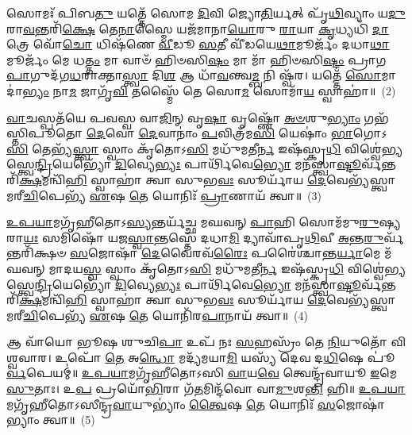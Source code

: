𑌸𑍋𑌮𑌃᳴ 𑌪𑌿𑌬\-\ul{𑌤𑍁} 𑌯𑌤𑍍𑌤𑍇᳴ 𑌸𑍋𑌮 \ul{𑌦𑌿}\-𑌵𑌿 𑌜𑍍𑌯𑍋\-\ul{𑌤𑌿}\-𑌰𑍍𑌯𑌤𑍍 𑌪𑍃᳴\-\ul{𑌥𑌿}\-𑌵𑍍𑌯𑌾𑌂 𑌯\-\ul{𑌦𑍁}\-𑌰𑌾\-\ul{𑌵}\-𑌨𑍍𑌤𑌰𑌿᳴\-\ul{𑌕𑍍𑌷𑍇} 𑌤𑍇\-\ul{𑌨𑌾}\-𑌸𑍍𑌮𑍈 𑌯𑌜᳴𑌮𑌾𑌨𑌾\-\ul{𑌯𑍋}\-𑌰𑍁 \ul{𑌰𑌾}\-𑌯𑌾 \ul{𑌕𑍃}\-𑌧𑍍𑌯𑌧𑌿᳴ \ul{𑌦𑌾}\-𑌤𑍍𑌰𑍇 𑌵𑍋᳴\-\ul{𑌚𑍋} 𑌧𑌿𑌷᳴𑌣𑍇 \ul{𑌵𑍀}\-𑌡𑍂 \ul{𑌸}\-𑌤𑍀 𑌵𑍀᳴𑌡𑌯𑍇\-\ul{𑌥𑌾}\-𑌮𑍂𑌰𑍍𑌜𑌂᳴ 𑌦𑌧𑌾\-\ul{𑌥𑌾}\-𑌮𑍂𑌰𑍍𑌜𑌂᳴ 𑌮𑍇 𑌧\-\ul{𑌤𑍍𑌤𑌂} 𑌮𑌾 𑌵𑌾𑍞᳴ 𑌹𑌿𑍞𑌸𑌿\-\ul{𑌷𑌂} 𑌮𑌾 𑌮𑌾᳴ 𑌹𑌿𑍞𑌸𑌿\-\ul{𑌷𑍍𑌟𑌂} 𑌪𑍍𑌰𑌾𑌗\-\ul{𑌪𑌾}\-𑌗𑍁𑌦᳴𑌗\-\ul{𑌧}\-𑌰𑌾𑌕𑍍𑌤𑌾\-\ul{𑌸𑍍𑌤𑍍𑌵𑌾} 𑌦𑌿\-\ul{𑌶} 𑌆 𑌧𑌾᳴\-\ul{𑌵}\-𑌨𑍍𑌤𑍍𑌵\-\ul{𑌮𑍍𑌬} 𑌨𑌿 𑌷𑍍𑌵᳴𑌰। 𑌯𑌤𑍍𑌤𑍇᳴ \ul{𑌸𑍋}\-𑌮𑌾𑌦𑌾॑\-\ul{𑌭𑍍𑌯𑌂} 𑌨𑌾\-\ul{𑌮} 𑌜𑌾𑌗𑍃᳴\-\ul{𑌵𑌿} 𑌤𑌸𑍍𑌮𑍈᳴ 𑌤𑍇 𑌸𑍋\-\ul{𑌮} 𑌸𑍋𑌮𑌾᳴\-\ul{𑌯} 𑌸𑍍𑌵𑌾𑌹𑌾॑॥~(2)

{\anuvakamend[{\-\ul{𑌯𑍁}\-𑌷𑍍𑌮𑌾𑌕𑍟᳴ 𑌸𑍍𑌵\-\ul{𑌰} 𑌯\-\ul{𑌤𑍍𑌤𑍇} 𑌨𑌵᳴ 𑌚}]}%

\-\ul{𑌵𑌾}\-𑌚𑌸𑍍𑌪𑌤᳴𑌯𑍇 𑌪𑌵𑌸𑍍𑌵 𑌵𑌾\-\ul{𑌜𑌿}\-𑌨𑍍 𑌵𑍃\-\ul{𑌷𑌾} 𑌵𑍃𑌷𑍍𑌣𑍋᳴ \ul{𑌅}\-\-\ul{𑍞}\-𑌶𑍁\-\ul{𑌭𑍍𑌯𑌾𑌂} 𑌗𑌭᳴𑌸𑍍𑌤𑌿𑌪𑍂𑌤𑍋 \ul{𑌦𑍇}\-𑌵𑍋 \ul{𑌦𑍇}\-𑌵𑌾𑌨𑌾𑌂॑ \ul{𑌪}\-𑌵𑌿𑌤𑍍𑌰᳴𑌮\-\ul{𑌸𑌿} 𑌯𑍇𑌷𑌾𑌂॑ \ul{𑌭𑌾}\-𑌗𑍋\-𑌽\-\ul{𑌸𑌿} 𑌤𑍇𑌭𑍍𑌯᳴\-\ul{𑌸𑍍𑌤𑍍𑌵𑌾} 𑌸𑍍𑌵𑌾𑌂 𑌕𑍃᳴𑌤𑍋\-𑌽\-\ul{𑌸𑌿} 𑌮𑌧𑍁᳴𑌮𑌤𑍀\-\ul{𑌰𑍍𑌨} 𑌇𑌷᳴𑌸𑍍𑌕𑍃\-\ul{𑌧𑌿} 𑌵𑌿𑌶𑍍𑌵𑍇॑𑌭𑍍𑌯𑌸𑍍𑌤𑍍𑌵𑍇\-\ul{𑌨𑍍𑌦𑍍𑌰𑌿}\-𑌯𑍇𑌭𑍍𑌯𑍋᳴ \ul{𑌦𑌿}\-𑌵𑍍𑌯𑍇\-\ul{𑌭𑍍𑌯𑌃} 𑌪𑌾𑌰𑍍𑌥𑌿᳴𑌵𑍇\-\ul{𑌭𑍍𑌯𑍋} 𑌮𑌨᳴𑌸𑍍𑌤𑍍𑌵𑌾\-\ul{𑌷𑍍𑌟𑍂}\-𑌰𑍍𑌵᳴𑌨𑍍𑌤\-𑌰𑌿᳴\-\ul{𑌕𑍍𑌷}\-𑌮𑌨𑍍𑌵𑌿᳴\-\ul{𑌹𑌿} 𑌸𑍍𑌵𑌾𑌹𑌾॑ 𑌤𑍍𑌵𑌾 𑌸𑍁𑌭\-\ul{𑌵𑌃} 𑌸𑍂𑌰𑍍𑌯𑌾᳴𑌯 \ul{𑌦𑍇}\-𑌵𑍇𑌭𑍍𑌯᳴𑌸𑍍𑌤𑍍𑌵𑌾 𑌮𑌰𑍀\-\ul{𑌚𑌿}\-𑌪𑍇𑌭𑍍𑌯᳴ \ul{𑌏}\-𑌷 \ul{𑌤𑍇} 𑌯𑍋𑌨𑌿𑌃᳴ \ul{𑌪𑍍𑌰𑌾}\-𑌣𑌾𑌯᳴ 𑌤𑍍𑌵𑌾॥~(3)

{\anuvakamend[{\-\ul{𑌵𑌾}\-𑌚𑌃 \ul{𑌸}\-𑌪𑍍𑌤𑌚᳴𑌤𑍍𑌵𑌾𑌰𑌿𑍞𑌶𑌤𑍍}]}%

\-\ul{𑌉}\-\-\ul{𑌪}\-\-\ul{𑌯𑌾}\-𑌮𑌗𑍃᳴𑌹𑍀𑌤𑍋\-𑌽\-\ul{𑌸𑍍𑌯}\-𑌨𑍍𑌤𑌰𑍍𑌯᳴𑌚𑍍𑌛 𑌮𑌘𑌵𑌨𑍍 \ul{𑌪𑌾}\-𑌹𑌿 𑌸𑍋𑌮᳴𑌮𑍁\-\ul{𑌰𑍁}\-𑌷𑍍𑌯 𑌰𑌾\-\ul{𑌯𑌃} 𑌸𑌮𑌿𑌷𑍋᳴ 𑌯𑌜\-\ul{𑌸𑍍𑌵𑌾}\-𑌨𑍍𑌤𑌸𑍍𑌤𑍇᳴ 𑌦𑌧𑌾\-\ul{𑌮𑌿} 𑌦𑍍𑌯𑌾𑌵𑌾᳴𑌪𑍃\-\ul{𑌥𑌿}\-𑌵𑍀 \ul{𑌅}\-𑌨𑍍𑌤\-\ul{𑌰𑍁}\-𑌰𑍍𑌵᳴𑌨𑍍𑌤𑌰𑌿᳴𑌕𑍍𑌷𑍞 \ul{𑌸}\-𑌜𑍋𑌷𑌾᳴ \ul{𑌦𑍇}\-𑌵𑍈𑌰𑌵᳴\-\ul{𑌰𑍈𑌃} 𑌪𑌰𑍈॑𑌶𑍍𑌚𑌾𑌨𑍍𑌤\-\ul{𑌰𑍍𑌯𑌾}\-𑌮𑍇 𑌮᳴𑌘𑌵𑌨𑍍 𑌮𑌾𑌦𑌯\-\ul{𑌸𑍍𑌵} 𑌸𑍍𑌵𑌾𑌂 𑌕𑍃᳴𑌤𑍋\-𑌽\-\ul{𑌸𑌿} 𑌮𑌧𑍁᳴𑌮𑌤𑍀\-\ul{𑌰𑍍𑌨} 𑌇𑌷᳴𑌸𑍍𑌕𑍃\-\ul{𑌧𑌿} 𑌵𑌿𑌶𑍍𑌵𑍇॑𑌭𑍍𑌯𑌸𑍍𑌤𑍍𑌵𑍇\-\ul{𑌨𑍍𑌦𑍍𑌰𑌿}\-𑌯𑍇𑌭𑍍𑌯𑍋᳴ \ul{𑌦𑌿}\-𑌵𑍍𑌯𑍇\-\ul{𑌭𑍍𑌯𑌃} 𑌪𑌾𑌰𑍍𑌥𑌿᳴𑌵𑍇\-\ul{𑌭𑍍𑌯𑍋} 𑌮𑌨᳴𑌸𑍍𑌤𑍍𑌵𑌾\-\ul{𑌷𑍍𑌟𑍂}\-𑌰𑍍𑌵᳴𑌨𑍍𑌤\-𑌰𑌿᳴\-\ul{𑌕𑍍𑌷}\-𑌮𑌨𑍍𑌵𑌿᳴\-\ul{𑌹𑌿} 𑌸𑍍𑌵𑌾𑌹𑌾॑ 𑌤𑍍𑌵𑌾 𑌸𑍁𑌭\-\ul{𑌵𑌃} 𑌸𑍂𑌰𑍍𑌯𑌾᳴𑌯 \ul{𑌦𑍇}\-𑌵𑍇𑌭𑍍𑌯᳴𑌸𑍍𑌤𑍍𑌵𑌾 𑌮𑌰𑍀\-\ul{𑌚𑌿}\-𑌪𑍇𑌭𑍍𑌯᳴ \ul{𑌏}\-𑌷 \ul{𑌤𑍇} 𑌯𑍋𑌨𑌿᳴𑌰\-\ul{𑌪𑌾}\-𑌨𑌾𑌯᳴ 𑌤𑍍𑌵𑌾॥~(4)

{\anuvakamend[{\-\ul{𑌦𑍇}\-𑌵𑍇𑌭𑍍𑌯𑌃᳴ \ul{𑌸}\-𑌪𑍍𑌤 𑌚᳴}]}%

𑌆 𑌵𑌾᳴𑌯𑍋 𑌭𑍂𑌷 𑌶𑍁𑌚𑌿\-\ul{𑌪𑌾} 𑌉𑌪᳴ 𑌨𑌃 \ul{𑌸}\-𑌹𑌸𑍍𑌰𑌂᳴ 𑌤𑍇 \ul{𑌨𑌿}\-𑌯𑍁𑌤𑍋᳴ 𑌵𑌿𑌶𑍍𑌵𑌵𑌾𑌰। 𑌉𑌪𑍋᳴ \ul{𑌤𑍇} 𑌅\-\ul{𑌨𑍍𑌧𑍋} 𑌮𑌦𑍍𑌯᳴𑌮𑌯𑌾\-\ul{𑌮𑌿} 𑌯𑌸𑍍𑌯᳴ 𑌦𑍇𑌵 𑌦\-\ul{𑌧𑌿}\-𑌷𑍇 𑌪𑍂॑\-\ul{𑌰𑍍𑌵}\-𑌪𑍇𑌯𑌮𑍍॑॥ \ul{𑌉}\-\-\ul{𑌪}\-\-\ul{𑌯𑌾}\-𑌮𑌗𑍃᳴𑌹𑍀𑌤𑍋\-𑌽𑌸𑌿 \ul{𑌵𑌾}\-𑌯\-\ul{𑌵𑍇} 𑌤𑍍𑌵𑍇𑌨𑍍𑌦𑍍𑌰᳴𑌵𑌾𑌯𑍂 \ul{𑌇}\-𑌮𑍇 \ul{𑌸𑍁}\-𑌤𑌾𑌃। 𑌉\-\ul{𑌪} 𑌪𑍍𑌰𑌯𑍋᳴\-\ul{𑌭𑌿}\-𑌰𑌾 𑌗᳴\-\ul{𑌤}\-𑌮𑌿𑌨𑍍𑌦᳴𑌵𑍋 𑌵𑌾\-\ul{𑌮𑍁}\-𑌶\-\ul{𑌨𑍍𑌤𑌿} 𑌹𑌿॥ \ul{𑌉}\-\-\ul{𑌪}\-\-\ul{𑌯𑌾}\-𑌮𑌗𑍃᳴𑌹𑍀𑌤𑍋\-𑌽𑌸𑍀𑌨𑍍𑌦𑍍𑌰\-\ul{𑌵𑌾}\-𑌯𑍁\-𑌭𑍍𑌯𑌾𑌂॑ \ul{𑌤𑍍𑌵𑍈}\-𑌷 \ul{𑌤𑍇} 𑌯𑍋𑌨𑌿𑌃᳴ \ul{𑌸}\-𑌜𑍋𑌷𑌾॑𑌭𑍍𑌯𑌾𑌂 𑌤𑍍𑌵𑌾॥~(5)

